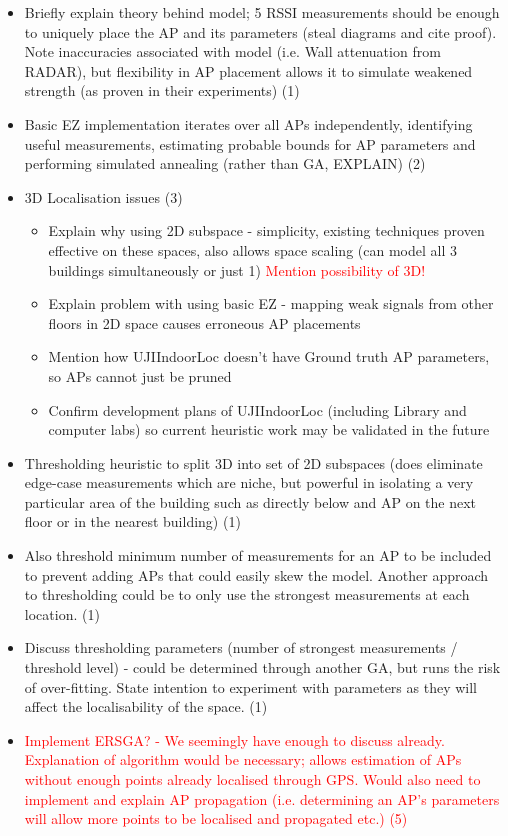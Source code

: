\documentclass{UoYCSproject}
\begin{document}
                \begin{itemize}
                    \item Briefly explain theory behind model; 5 RSSI measurements should be enough to uniquely place the AP and its parameters (steal diagrams and cite proof). Note inaccuracies associated with model (i.e. Wall attenuation from RADAR), but flexibility in AP placement allows it to simulate weakened strength (as proven in their experiments) (1)
                    \item Basic EZ implementation iterates over all APs independently, identifying useful measurements, estimating probable bounds for AP parameters and performing simulated annealing (rather than GA, EXPLAIN) (2)
                    \item 3D Localisation issues (3)
                    \begin{itemize}
                        \item Explain why using 2D subspace - simplicity, existing techniques proven effective on these spaces, also allows space scaling (can model all 3 buildings simultaneously or just 1) \textcolor{red}{Mention possibility of 3D!}
                        \item Explain problem with using basic EZ - mapping weak signals from other floors in 2D space causes erroneous AP placements
                        \item Mention how UJIIndoorLoc doesn't have Ground truth AP parameters, so APs cannot just be pruned
                        \item Confirm development plans of UJIIndoorLoc (including Library and computer labs) so current heuristic work may be validated in the future
                    \end{itemize}
                    \item Thresholding heuristic to split 3D into set of 2D subspaces (does eliminate edge-case measurements which are niche, but powerful in isolating a very particular area of the building such as directly below and AP on the next floor or in the nearest building) (1)
                    \item Also threshold minimum number of measurements for an AP to be included to prevent adding APs that could easily skew the model. Another approach to thresholding could be to only use the strongest measurements at each location. (1)
                    \item Discuss thresholding parameters (number of strongest measurements / threshold level) - could be determined through another GA, but runs the risk of over-fitting. State intention to experiment with parameters as they will affect the localisability of the space. (1)
                    \item \textcolor{red}{Implement ERSGA? - We seemingly have enough to discuss already. Explanation of algorithm would be necessary; allows estimation of APs without enough points already localised through GPS. Would also need to implement and explain AP propagation (i.e. determining an AP's parameters will allow more points to be localised and propagated etc.) (5)}
                \end{itemize}
            
\end{document}
